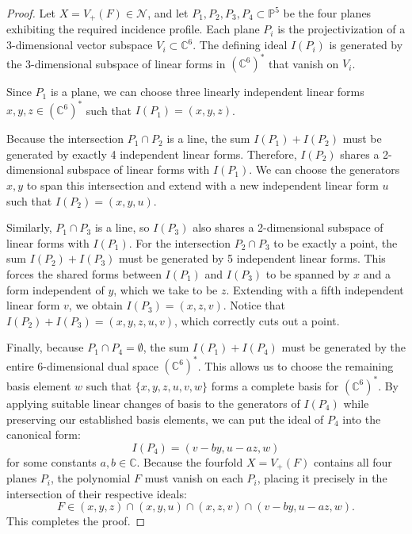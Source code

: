 \documentclass[10pt,a4paper]{amsart}
\begin{document}
\begin{proof}
Let $X = V_+(F) \in \mathcal{N}$, and let $P_1,P_2,P_3,P_4 \subset \mathbb{P}^5$ be the four planes exhibiting the required incidence profile. Each plane $P_i$ is the projectivization of a 3-dimensional vector subspace $V_i \subset \mathbb{C}^6$. The defining ideal $I(P_i)$ is generated by the 3-dimensional subspace of linear forms in $(\mathbb{C}^6)^*$ that vanish on $V_i$.

Since $P_1$ is a plane, we can choose three linearly independent linear forms $x,y,z \in (\mathbb{C}^6)^*$ such that $I(P_1) = ( x,y,z )$. 

Because the intersection $P_1 \cap P_2$ is a line, the sum $I(P_1) + I(P_2)$ must be generated by exactly 4 independent linear forms. Therefore, $I(P_2)$ shares a 2-dimensional subspace of linear forms with $I(P_1)$. We can choose the generators $x,y$ to span this intersection and extend with a new independent linear form $u$ such that $I(P_2) = ( x,y,u )$.

Similarly, $P_1 \cap P_3$ is a line, so $I(P_3)$ also shares a 2-dimensional subspace of linear forms with $I(P_1)$. For the intersection $P_2 \cap P_3$ to be exactly a point, the sum $I(P_2) + I(P_3)$ must be generated by 5 independent linear forms. This forces the shared forms between $I(P_1)$ and $I(P_3)$ to be spanned by $x$ and a form independent of $y$, which we take to be $z$. Extending with a fifth independent linear form $v$, we obtain $I(P_3) = ( x,z,v )$. Notice that $I(P_2) + I(P_3) = ( x,y,z,u,v )$, which correctly cuts out a point.

Finally, because $P_1 \cap P_4 = \emptyset$, the sum $I(P_1) + I(P_4)$ must be generated by the entire 6-dimensional dual space $(\mathbb{C}^6)^*$. This allows us to choose the remaining basis element $w$ such that $\{x,y,z,u,v,w\}$ forms a complete basis for $(\mathbb{C}^6)^*$. By applying suitable linear changes of basis to the generators of $I(P_4)$ while preserving our established basis elements, we can put the ideal of $P_4$ into the canonical form:
$$I(P_4) = ( v-by,u-az,w )$$
for some constants $a,b \in \mathbb{C}$. Because the fourfold $X = V_+(F)$ contains all four planes $P_i$, the polynomial $F$ must vanish on each $P_i$, placing it precisely in the intersection of their respective ideals:
$$F \in ( x,y,z ) \cap ( x,y,u ) \cap ( x,z,v ) \cap ( v-by,u-az,w ).$$
This completes the proof.
\end{proof}
\end{document}
